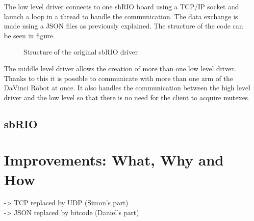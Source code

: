 The low level driver connects to one sbRIO board using a TCP/IP socket and launch a loop in a thread to handle the communication. The data exchange is made using a JSON files as previously explained. The structure of the code can be seen in figure.

\begin{figure}[H]
\centering
{}
\caption{Structure of the original sbRIO driver}
\label{original_driver}
\end{figure}

The middle level driver allows the creation of more than one low level driver. Thanks to this it is possible to communicate with more than one arm of the DaVinci Robot at once. It also handles the communication between the high level driver and the low level so that there is no need for the client to acquire mutexes.


\subsection{sbRIO}

\section{Improvements: What, Why and How}

-> TCP replaced by UDP			(Simon's part)\\
-> JSON replaced by bitcode		(Daniel's part)\\

